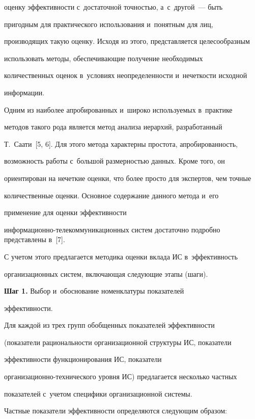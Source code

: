 оценку эффективности с~достаточной точностью, а~с~другой~--- быть 

пригодным для практического использования и~понятным для лиц, 

производящих такую оценку. Исходя из этого, представляется целесообразным 

использовать методы, обеспечивающие получение необходимых 

количественных оценок в~условиях неопределенности и~нечеткости исходной 

информации. 

  

  Одним из наиболее апробированных и~широко используемых в~практике 

методов такого рода является метод анализа иерархий, разработанный 

Т.~Саати~[5, 6]. Для этого метода характерны простота, апробированность, 

возможность работы с~большой размерностью данных. Кроме того, он 

ориентирован на нечеткие оценки, что более просто для экспертов, чем точные 

количественные оценки. Основное содержание данного метода и~его 

применение для оценки эффективности 

информационно-телекоммуникационных систем достаточно подробно представлены в~[7].

  

  С учетом этого предлагается методика оценки вклада ИС в~эффективность 

организационных систем, включающая следующие этапы (шаги). 

  

  \textbf{Шаг 1.} Выбор и~обоснование номенклатуры показателей 

эффективности.

  

  Для каждой из трех групп обобщенных показателей эффективности 

(показатели рациональности организационной структуры ИС, показатели 

эффективности функционирования ИС, показатели  

организационно-технического уровня ИС) предлагается несколько частных 

показателей с~учетом специфики организационной системы.

  

  Частные показатели эффективности определяются следующим образом:

